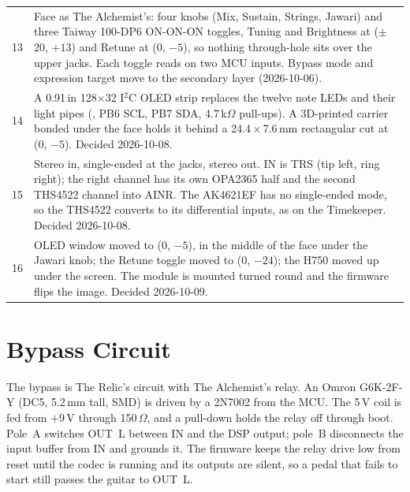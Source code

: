 \begin{table}[H]
\begin{tabularx}{\textwidth}{@{}r L@{}}
    13 & Face as The Alchemist's: four knobs (Mix, Sustain, Strings, Jawari) and three Taiway 100-DP6 ON-ON-ON toggles, Tuning and Brightness at ($\pm$20, $+13$) and Retune at (0, $-5$), so nothing through-hole sits over the upper jacks. Each toggle reads on two MCU inputs. Bypass mode and expression target move to the secondary layer (2026-10-06). \\
    14 & A 0.91\,in 128$\times$32 I$^2$C OLED strip replaces the twelve note LEDs and their light pipes (, PB6 SCL, PB7 SDA, 4.7\,k$\Omega$ pull-ups). A 3D-printed carrier bonded under the face holds it behind a 24.4\,$\times$\,7.6\,mm rectangular cut at (0, $-5$). Decided 2026-10-08. \\
    15 & Stereo in, single-ended at the jacks, stereo out. IN is TRS (tip left, ring right); the right channel has its own OPA2365 half and the second THS4522 channel into AINR. The AK4621EF has no single-ended mode, so the THS4522 converts to its differential inputs, as on the Timekeeper. Decided 2026-10-08. \\
    16 & OLED window moved to (0, $-5$), in the middle of the face under the Jawari knob; the Retune toggle moved to (0, $-24$); the H750 moved up under the screen. The module is mounted turned round and the firmware flips the image. Decided 2026-10-09. \\
    \bottomrule
  \end{tabularx}
\end{table}

\section{Bypass Circuit}
The bypass is The Relic's circuit with The Alchemist's relay. An Omron G6K-2F-Y (DC5, 5.2\,mm tall, SMD) is driven by a 2N7002 from the MCU. The 5\,V coil is fed from $+9$\,V through 150\,$\Omega$, and a pull-down holds the relay off through boot. Pole~A switches OUT~L between IN and the DSP output; pole~B disconnects the input buffer from IN and grounds it. The firmware keeps the relay drive low from reset until the codec is running and its outputs are silent, so a pedal that fails to start still passes the guitar to OUT~L.
